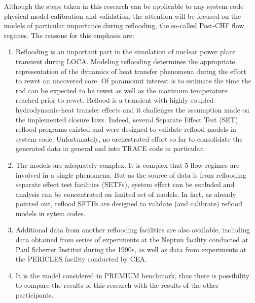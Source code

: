 \documentclass[11pt,titlepage]{article}
\begin{document}
Although the steps taken in this research can be applicable to any system code physical model calibration and validation, the attention will be focused on the models of particular importance during reflooding, the so-called Post-CHF flow regimes. 
The reasons for this emphasis are:
\begin{enumerate}
	\item Reflooding is an important part in the simulation of nuclear power plant transient during LOCA. 
	Modeling reflooding determines the appropriate representation of the dynamics of heat transfer phenomena during the effort to rewet an uncovered core. 
	Of paramount interest is to estimate the time the rod can be expected to be rewet as well as the maximum temperature reached prior to rewet. 
	Reflood is a transient with highly coupled hydrodynamic-heat transfer effects and it challenges the assumption made on the implemented closure laws. 
	Indeed, several Separate Effect Test (SET) reflood programs existed and were designed to validate reflood models in system code. 
	Unfortunately, no orchestrated effort so far to consolidate the generated data in general and into TRACE code in particular.
	\item The models are adequately complex. 
	It is complex that 5 flow regimes are involved in a single phenomena. 
	But as the source of data is from reflooding separate effect test facilities (SETFs), system effect can be excluded and analysis can be concentrated on limited set of models. 
	In fact, as already pointed out, reflood SETFs are designed to validate (and calibrate) reflood models in sytem codes.
	\item Additional data from another reflooding facilities are also available, including data obtained from series of experiments at the Neptun facility conducted at Paul Scherrer Institut during the 1990s, as well as data from experiments at the PERICLES facility conducted by CEA.
	\item It is the model considered in PREMIUM benchmark, thus there is possibility to compare the results of this research with the results of the other participants.
\end{enumerate}
\end{document}
